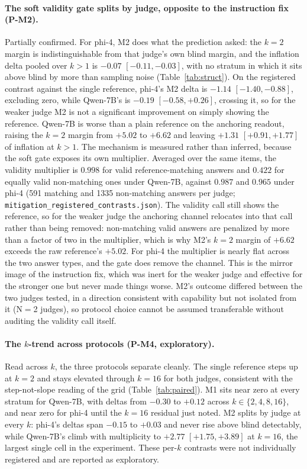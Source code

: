 \documentclass[11pt]{article}
\begin{document}
\paragraph{The soft validity gate splits by judge, opposite to the instruction fix (P-M2).}
Partially confirmed.
For phi-4, M2 does what the prediction asked: the $k{=}2$ margin is indistinguishable from that judge's own blind margin, and the inflation delta pooled over $k > 1$ is $-0.07$ $[-0.11, -0.03]$, with no stratum in which it sits above blind by more than sampling noise (Table~\ref{tab:struct}).
On the registered contrast against the single reference, phi-4's M2 delta is $-1.14$ $[-1.40, -0.88]$, excluding zero, while Qwen-7B's is $-0.19$ $[-0.58, +0.26]$, crossing it, so for the weaker judge M2 is not a significant improvement on simply showing the reference.
Qwen-7B is worse than a plain reference on the anchoring readout, raising the $k{=}2$ margin from $+5.02$ to $+6.62$ and leaving $+1.31$ $[+0.91, +1.77]$ of inflation at $k > 1$.
The mechanism is measured rather than inferred, because the soft gate exposes its own multiplier.
Averaged over the same items, the validity multiplier is $0.998$ for valid reference-matching answers and $0.422$ for equally valid non-matching ones under Qwen-7B, against $0.987$ and $0.965$ under phi-4 (591 matching and 1335 non-matching answers per judge; \texttt{mitigation\_registered\_contrasts.json}).
The validity call still shows the reference, so for the weaker judge the anchoring channel relocates into that call rather than being removed: non-matching valid answers are penalized by more than a factor of two in the multiplier, which is why M2's $k{=}2$ margin of $+6.62$ exceeds the raw reference's $+5.02$.
For phi-4 the multiplier is nearly flat across the two answer types, and the gate does remove the channel.
This is the mirror image of the instruction fix, which was inert for the weaker judge and effective for the stronger one but never made things worse.
M2's outcome differed between the two judges tested, in a direction consistent with capability but not isolated from it (N$=$2 judges), so protocol choice cannot be assumed transferable without auditing the validity call itself.

\paragraph{The $k$-trend across protocols (P-M4, exploratory).}
Read across $k$, the three protocols separate cleanly.
The single reference steps up at $k{=}2$ and stays elevated through $k{=}16$ for both judges, consistent with the step-not-slope reading of the grid (Table~\ref{tab:paired}).
M1 sits near zero at every stratum for Qwen-7B, with deltas from $-0.30$ to $+0.12$ across $k \in \{2,4,8,16\}$, and near zero for phi-4 until the $k{=}16$ residual just noted.
M2 splits by judge at every $k$: phi-4's deltas span $-0.15$ to $+0.03$ and never rise above blind detectably, while Qwen-7B's climb with multiplicity to $+2.77$ $[+1.75, +3.89]$ at $k{=}16$, the largest single cell in the experiment.
These per-$k$ contrasts were not individually registered and are reported as exploratory.
\end{document}
